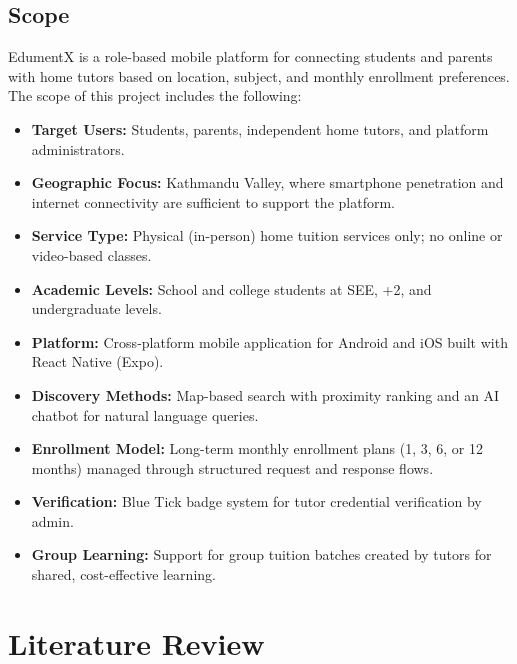 \documentclass[12pt]{report}
\begin{document}
\section{Scope}

EdumentX is a role-based mobile platform for connecting students
and parents with home tutors based on location, subject, and
monthly enrollment preferences. The scope of this project
includes the following:

\begin{itemize}
\item \textbf{Target Users:} Students, parents, independent home
tutors, and platform administrators.

\item \textbf{Geographic Focus:} Kathmandu Valley, where
smartphone penetration and internet connectivity are
sufficient to support the platform.

\item \textbf{Service Type:} Physical (in-person) home tuition
services only; no online or video-based classes.

\item \textbf{Academic Levels:} School and college students at
SEE, +2, and undergraduate levels.

\item \textbf{Platform:} Cross-platform mobile application for
Android and iOS built with React Native (Expo).

\item \textbf{Discovery Methods:} Map-based search with proximity
ranking and an AI chatbot for natural language queries.

\item \textbf{Enrollment Model:} Long-term monthly enrollment
plans (1, 3, 6, or 12 months) managed through structured
request and response flows.

\item \textbf{Verification:} Blue Tick badge system for tutor
credential verification by admin.

\item \textbf{Group Learning:} Support for group tuition batches
created by tutors for shared, cost-effective learning.
\end{itemize}

\chapter{Literature Review}
\end{document}
